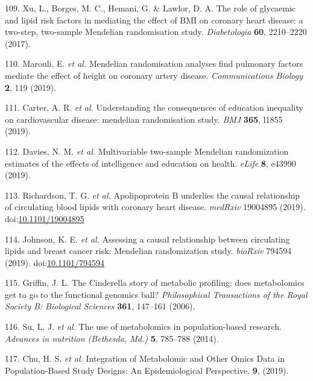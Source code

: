 \documentclass[11pt,twoside]{bristolthesis}
\begin{document}
\leavevmode\hypertarget{ref-Xu2017}{}%
109. Xu, L., Borges, M. C., Hemani, G. \& Lawlor, D. A. The role of glycaemic and lipid risk factors in mediating the effect of BMI on coronary heart disease: a two-step, two-sample Mendelian randomisation study. \emph{Diabetologia} \textbf{60}, 2210--2220 (2017).

\leavevmode\hypertarget{ref-Marouli2019}{}%
110. Marouli, E. \emph{et al.} Mendelian randomisation analyses find pulmonary factors mediate the effect of height on coronary artery disease. \emph{Communications Biology} \textbf{2}, 119 (2019).

\leavevmode\hypertarget{ref-Carter2019}{}%
111. Carter, A. R. \emph{et al.} Understanding the consequences of education inequality on cardiovascular disease: mendelian randomisation study. \emph{BMJ} \textbf{365}, l1855 (2019).

\leavevmode\hypertarget{ref-Davies2019}{}%
112. Davies, N. M. \emph{et al.} Multivariable two-sample Mendelian randomization estimates of the effects of intelligence and education on health. \emph{eLife} \textbf{8}, e43990 (2019).

\leavevmode\hypertarget{ref-Richardson2019}{}%
113. Richardson, T. G. \emph{et al.} Apolipoprotein B underlies the causal relationship of circulating blood lipids with coronary heart disease. \emph{medRxiv} 19004895 (2019). doi:\href{https://doi.org/10.1101/19004895}{10.1101/19004895}

\leavevmode\hypertarget{ref-Johnson2019}{}%
114. Johnson, K. E. \emph{et al.} Assessing a causal relationship between circulating lipids and breast cancer risk: Mendelian randomization study. \emph{bioRxiv} 794594 (2019). doi:\href{https://doi.org/10.1101/794594}{10.1101/794594}

\leavevmode\hypertarget{ref-Griffin2006}{}%
115. Griffin, J. L. The Cinderella story of metabolic profiling: does metabolomics get to go to the functional genomics ball? \emph{Philosophical Transactions of the Royal Society B: Biological Sciences} \textbf{361}, 147--161 (2006).

\leavevmode\hypertarget{ref-Su2014}{}%
116. Su, L. J. \emph{et al.} The use of metabolomics in population-based research. \emph{Advances in nutrition (Bethesda, Md.)} \textbf{5}, 785--788 (2014).

\leavevmode\hypertarget{ref-Chu2019}{}%
117. Chu, H. S. \emph{et al.} Integration of Metabolomic and Other Omics Data in Population-Based Study Designs: An Epidemiological Perspective. \textbf{9}, (2019).
\end{document}
